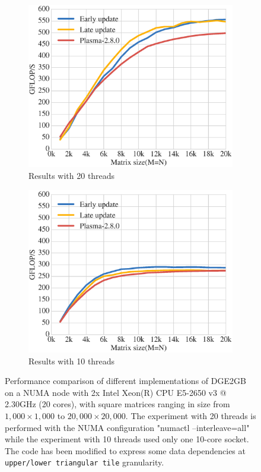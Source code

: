 \begin{figure}[h!]
  \begin{subfigure}[t]{0.5 \textwidth}
    \includegraphics[width=\textwidth]{fig/dge2gb_HASWELL_HACK}
    \caption{\label{fig:dge2gb_HASWELL_HACK_20}
      Results with 20 threads}
  \end{subfigure}
  \hfill
  \begin{subfigure}[t]{0.5 \textwidth}
    \includegraphics[width=\textwidth]{fig/dge2gb_HASWELL_HACK_10}
    \caption{\label{fig:dge2gb_HASWELL_HACK_10}
      Results with 10 threads}
  \end{subfigure}
  \caption{Performance comparison of different implementations of
    DGE2GB on a NUMA node with
    2x Intel Xeon(R) CPU E5-2650 v3 @ 2.30GHz (20 cores),
    with square matrices ranging in size from $1,000 \times 1,000$ to
    $20,000 \times 20,000$. The experiment with 20 threads is performed
    with the NUMA configuration "numactl --interleave=all" while the
    experiment with 10 threads used only one 10-core socket.
    The code has been modified to  express some
    data dependencies at \texttt{upper/lower triangular tile} granularity.}
  \label{fig:dge2gb_HASWELL_HACK}
\end{figure}

